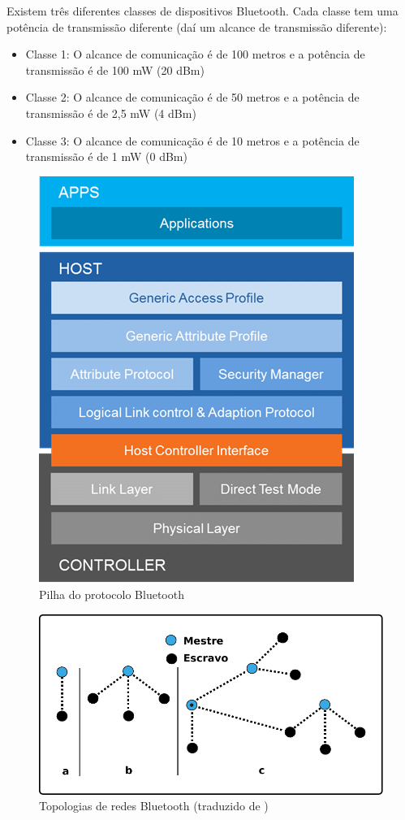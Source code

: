 Existem três diferentes classes de dispositivos Bluetooth. Cada classe
tem uma potência de transmissão diferente (daí um alcance de transmissão
diferente)\cite{BluetoothCore}:
\begin{itemize}
\item Classe 1: O alcance de comunicação é de 100 metros e a potência de
transmissão é de 100 mW (20 dBm)
\item Classe 2: O alcance de comunicação é de 50 metros e a potência de
transmissão é de 2,5 mW (4 dBm)
\item Classe 3: O alcance de comunicação é de 10 metros e a potência de
transmissão é de 1 mW (0 dBm)
\end{itemize}
\begin{figure}
\begin{centering}
\includegraphics[width=0.4\linewidth]{Imagens/Cap_2/bluetooth_stack}
\par\end{centering}
\caption{Pilha do protocolo Bluetooth \cite{BluetoothCore} \label{fig:bluetooth_stack}}
\end{figure}

\begin{figure}
\begin{centering}
\includegraphics[width=0.6\linewidth]{Imagens/Cap_2/bluetooth_net}
\par\end{centering}
\caption[Topologias de redes Bluetooth]{Topologias de redes Bluetooth (traduzido de \cite{BluetoothSpecv1})
\label{fig:bluetooth_net}}
\end{figure}


